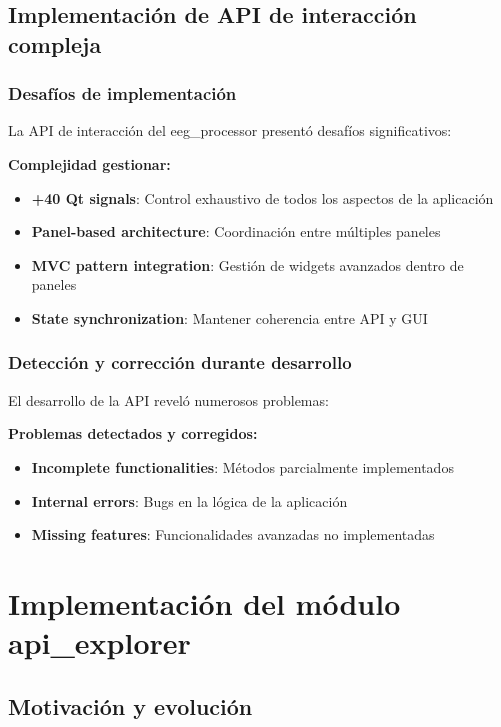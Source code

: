 \subsection{Implementación de API de interacción compleja}
\label{subsec:api_interaccion_compleja}

\subsubsection{Desafíos de implementación}

La API de interacción del eeg\_processor presentó desafíos significativos:

\textbf{Complejidad gestionar:}
\begin{itemize}
    \item \textbf{+40 Qt signals}: Control exhaustivo de todos los aspectos de la aplicación
    \item \textbf{Panel-based architecture}: Coordinación entre múltiples paneles
    \item \textbf{MVC pattern integration}: Gestión de widgets avanzados dentro de paneles
    \item \textbf{State synchronization}: Mantener coherencia entre API y GUI
\end{itemize}

\subsubsection{Detección y corrección durante desarrollo}

El desarrollo de la API reveló numerosos problemas:

\textbf{Problemas detectados y corregidos:}
\begin{itemize}
    \item \textbf{Incomplete functionalities}: Métodos parcialmente implementados
    \item \textbf{Internal errors}: Bugs en la lógica de la aplicación
    \item \textbf{Missing features}: Funcionalidades avanzadas no implementadas
\end{itemize}

\section{Implementación del módulo api\_explorer}
\label{sec:implementacion_api_explorer}

\subsection{Motivación y evolución}
\label{subsec:motivacion_api_explorer}

